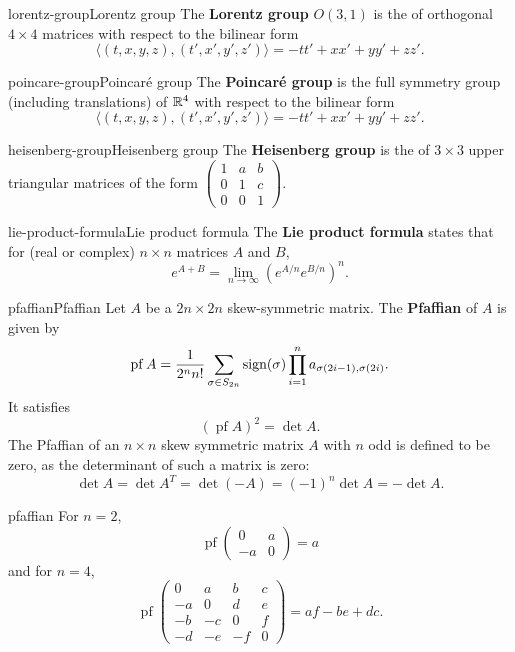 \begin{topic}{lorentz-group}{Lorentz group}
    The \textbf{Lorentz group} $O(3, 1)$ is the  of orthogonal $4 \times 4$ matrices with respect to the bilinear form
    \[ \langle (t, x, y, z), (t', x', y', z') \rangle = - tt' + xx' + yy' + zz' . \]
\end{topic}

\begin{topic}{poincare-group}{Poincaré group}
    The \textbf{Poincaré group} is the full symmetry group (including translations) of $\mathbb{R}^4$ with respect to the bilinear form
    \[ \langle (t, x, y, z), (t', x', y', z') \rangle = - tt' + xx' + yy' + zz' . \]
\end{topic}

\begin{topic}{heisenberg-group}{Heisenberg group}
    The \textbf{Heisenberg group} is the  of $3 \times 3$ upper triangular matrices of the form $\begin{pmatrix} 1 & a & b \\ 0 & 1 & c \\ 0 & 0 & 1 \end{pmatrix}$.
\end{topic}

\begin{topic}{lie-product-formula}{Lie product formula}
    The \textbf{Lie product formula} states that for (real or complex) $n \times n$ matrices $A$ and $B$,
    \[ e^{A + B} = \lim_{n \to \infty} \left( e^{A/n} e^{B/n} \right)^n . \]
\end{topic}

\begin{topic}{pfaffian}{Pfaffian}
    Let $A$ be a $2n \times 2n$ skew-symmetric matrix. The \textbf{Pfaffian} of $A$ is given by
    \[ \operatorname{pf} A = \frac{1}{2^n n!} \sum_{\sigma \in S_{2n}} \textup{sign}(\sigma) \prod_{i = 1}^{n} a_{\sigma(2i - 1), \sigma(2i)} . \]
    It satisfies
    \[ (\operatorname{pf} A)^2 = \det A . \]
    The Pfaffian of an $n \times n$ skew symmetric matrix $A$ with $n$ odd is defined to be zero, as the determinant of such a matrix is zero:
    \[ \det A = \det A^T = \det (-A) = (-1)^n \det A = -\det A . \]
\end{topic}

\begin{example}{pfaffian}
    For $n = 2$,
    \[ \operatorname{pf} \begin{pmatrix} 0 & a \\ -a & 0 \end{pmatrix} = a \]
    and for $n = 4$,
    \[ \operatorname{pf} \begin{pmatrix} 0 & a & b & c \\ -a & 0 & d & e \\ -b & -c & 0 & f \\ -d & -e & -f & 0 \end{pmatrix} = af - be + dc . \]
\end{example}

